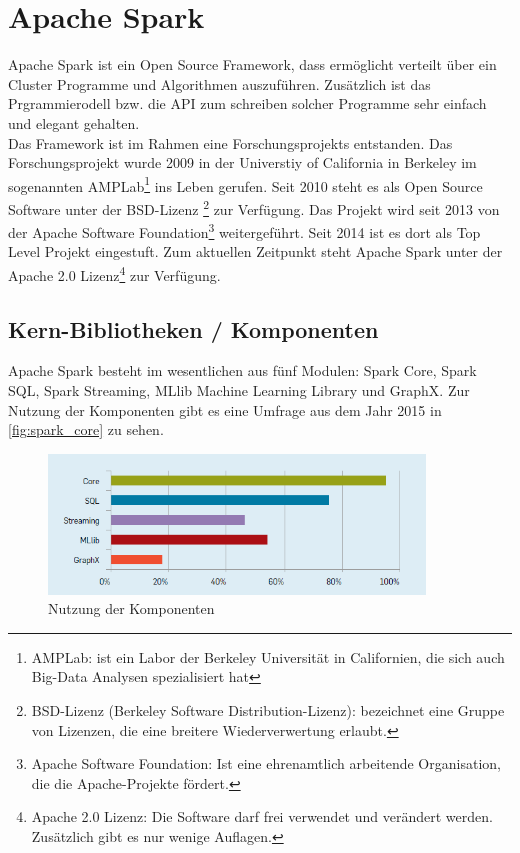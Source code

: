 \newpage
\chapter{Apache Spark} 

Apache Spark ist ein Open Source Framework, dass ermöglicht verteilt über ein Cluster Programme und Algorithmen auszuführen. Zusätzlich ist das Prgrammierodell bzw. die API zum schreiben solcher Programme sehr einfach und elegant gehalten. \cite{AAWS15} \\

\noindent
Das Framework ist im Rahmen eine Forschungsprojekts entstanden. Das Forschungsprojekt wurde 2009 in der Universtiy of California in Berkeley im sogenannten AMPLab\footnote{AMPLab: ist ein Labor der Berkeley Universität in Californien, die sich auch Big-Data Analysen spezialisiert hat } ins Leben gerufen. Seit 2010 steht es als Open Source Software unter der BSD-Lizenz \footnote{BSD-Lizenz (Berkeley Software Distribution-Lizenz): bezeichnet eine Gruppe von Lizenzen, die eine breitere Wiederverwertung erlaubt.} zur Verfügung. Das Projekt wird seit 2013 von der Apache Software Foundation\footnote{Apache Software Foundation: Ist eine ehrenamtlich arbeitende Organisation, die die Apache-Projekte fördert.} weitergeführt. Seit 2014 ist es dort als Top Level Projekt eingestuft. Zum aktuellen Zeitpunkt steht Apache Spark unter der Apache 2.0 Lizenz\footnote{Apache 2.0 Lizenz: Die Software darf frei verwendet und verändert werden. Zusätzlich gibt es nur wenige Auflagen.} zur Verfügung. \\



\section{Kern-Bibliotheken / Komponenten}

Apache Spark besteht im wesentlichen aus fünf Modulen: Spark Core, Spark SQL, Spark Streaming, MLlib Machine Learning Library und GraphX. Zur Nutzung der Komponenten gibt es eine Umfrage aus dem Jahr 2015 in \autoref{fig:spark_core} zu sehen. \\

\begin{figure}[h]
  \centering
  \includegraphics[width=100mm]{./bilder/spark_komponenten_nutzung.png}
  \caption{Nutzung der Komponenten \cite{ZXW+16}}\label{fig:spark_komp_nutzung}
\end{figure}



